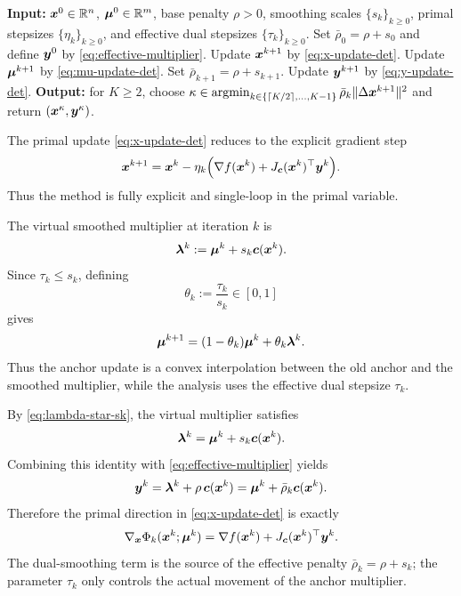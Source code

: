 \documentclass[10pt]{article}
\begin{document}
\begin{algorithm}[H]
    \caption{Adaptive Dual-Smoothing ALM for Smooth Equality Constraints}
    \label{alg:adaptive-dsalm}
    \small
    \begin{algorithmic}[1]
        \STATE \textbf{Input:} $\bm{x}^0\in\mathbb{R}^n$, $\bm{\mu}^0\in\mathbb{R}^m$,
        base penalty $\rho>0$, smoothing scales $\{s_k\}_{k\ge0}$,
        primal stepsizes $\{\eta_k\}_{k\ge0}$, and effective dual stepsizes
        $\{\tau_k\}_{k\ge0}$.
        \STATE Set $\bar\rho_0=\rho+s_0$ and define $\bm{y}^0$ by
        \eqref{eq:effective-multiplier}.
            \STATE Update $\bm{x}^{k+1}$ by \eqref{eq:x-update-det}.
            \STATE Update $\bm{\mu}^{k+1}$ by \eqref{eq:mu-update-det}.
            \STATE Set $\bar\rho_{k+1}=\rho+s_{k+1}$.
            \STATE Update $\bm{y}^{k+1}$ by \eqref{eq:y-update-det}.
        \ENDFOR
        \STATE \textbf{Output:} for $K\ge2$, choose
        $\kappa\in
        \operatorname*{\mathrm{argmin}}_{k\in\{\lceil K/2\rceil,\ldots,K-1\}}
        \bar\rho_k\|\Delta\bm{x}^{k+1}\|^2$ and return
        $(\bm{x}^\kappa,\bm{y}^\kappa)$.
    \end{algorithmic}
\end{algorithm}

\begin{remark}
\label{rmk:explicit-primal-step}
The primal update \eqref{eq:x-update-det} reduces to the explicit gradient
step
\[
    \bm{x}^{k+1}
    =
    \bm{x}^k
    -
    \eta_k
    \Bigl(
    \nabla f(\bm{x}^k)
    +J_{\bm{c}}(\bm{x}^k)^\top\bm{y}^k
    \Bigr).
\]
Thus the method is fully explicit and single-loop in the primal variable.
\end{remark}

\begin{remark}
\label{rmk:dual-smoothing-interpolation}
The virtual smoothed multiplier at iteration $k$ is
\[
    \bm{\lambda}^k
    :=
    \bm{\mu}^k+s_k\bm{c}(\bm{x}^k).
\]
Since $\tau_k\le s_k$, defining
\[
    \theta_k:=\frac{\tau_k}{s_k}\in[0,1]
\]
gives
\[
    \bm{\mu}^{k+1}
    =
    (1-\theta_k)\bm{\mu}^k+\theta_k\bm{\lambda}^k.
\]
Thus the anchor update is a convex interpolation between the old anchor and
the smoothed multiplier, while the analysis uses the effective dual stepsize
$\tau_k$.
\end{remark}

\begin{remark}
\label{rmk:fixed-penalty-view}
By \eqref{eq:lambda-star-sk}, the virtual multiplier satisfies
\[
    \bm{\lambda}^k=\bm{\mu}^k+s_k\bm{c}(\bm{x}^k).
\]
Combining this identity with \eqref{eq:effective-multiplier} yields
\[
    \bm{y}^k
    =
    \bm{\lambda}^k+\rho\,\bm{c}(\bm{x}^k)
    =
    \bm{\mu}^k+\bar\rho_k\bm{c}(\bm{x}^k).
\]
Therefore the primal direction in \eqref{eq:x-update-det} is exactly
\[
    \nabla_{\bm{x}}\Phi_k(\bm{x}^k;\bm{\mu}^k)
    =
    \nabla f(\bm{x}^k)+J_{\bm{c}}(\bm{x}^k)^\top\bm{y}^k.
\]
The dual-smoothing term is the source of the effective penalty
$\bar\rho_k=\rho+s_k$; the parameter $\tau_k$ only controls the actual
movement of the anchor multiplier.
\end{remark}
\end{document}
